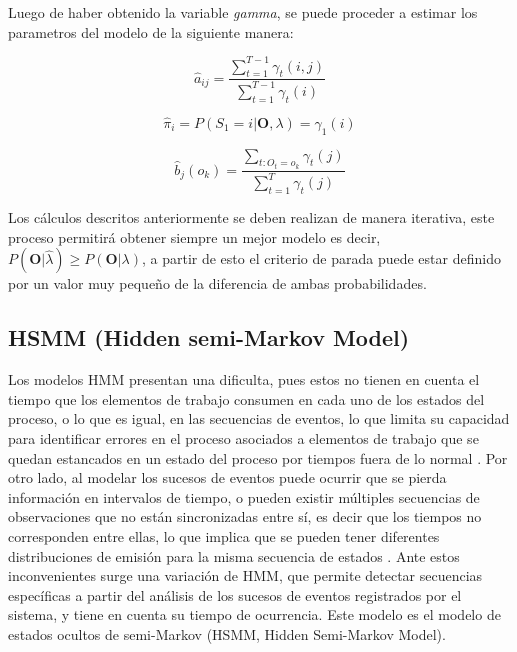 Luego de haber obtenido la variable \textit{gamma}, se puede proceder a estimar los parametros del modelo de la siguiente manera:

    \begin{equation}
        \hat{a}_{ij} = \dfrac{ \sum_{t = 1}^{T-1} \gamma_{t}(i,j) }{ \sum_{t = 1}^{T-1} \gamma_{t}(i) }
    \end{equation}
    
    \begin{equation}
        \hat{\pi}_{i} = P( S_{1} = i | \textbf{O}, \lambda ) = \gamma_{1}(i)
    \end{equation}
    
    \begin{equation}
        \hat{b}_{j}(o_{k}) = \dfrac{ \sum_{t:O_{t}=o_{k}} \gamma_{t}(j) }{ \sum_{t = 1}^{T} \gamma_{t}(j) }
    \end{equation}

Los cálculos descritos anteriormente se deben realizan de manera iterativa, este proceso permitirá obtener siempre un mejor modelo es decir,  $P(\textbf{O} | \hat{\lambda}) \geq P(\textbf{O} | \lambda)$, a partir de esto el criterio de parada puede estar definido por un valor muy pequeño de la diferencia de ambas probabilidades. 


\subsection{HSMM (Hidden semi-Markov Model) }

Los modelos HMM presentan una dificulta, pues estos no tienen en cuenta el tiempo que los elementos de trabajo consumen en cada uno de los estados del proceso, o lo que es igual, en las secuencias de eventos, lo que limita su capacidad para identificar errores en el proceso asociados a elementos de trabajo que se quedan estancados en un estado del proceso por tiempos fuera de lo normal \cite{Carrera2015}. Por otro lado, al modelar los sucesos de eventos puede ocurrir que se pierda información en intervalos de tiempo, o pueden existir múltiples secuencias de observaciones que no están sincronizadas entre sí, es decir que los tiempos no corresponden entre ellas, lo que implica que se pueden tener diferentes distribuciones de emisión para la misma secuencia de estados \cite{Yu2003}. Ante estos inconvenientes surge una variación de HMM, que permite detectar secuencias específicas a partir del análisis de los sucesos de eventos registrados por el sistema, y tiene en cuenta su tiempo de ocurrencia. Este modelo es el modelo de estados ocultos de semi-Markov (HSMM, Hidden Semi-Markov Model).

